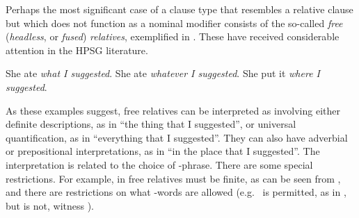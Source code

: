 \documentclass[output=paper
                ,modfonts
                ,nonflat
	        ,collection
	        ,collectionchapter
	        ,collectiontoclongg
 	        ,biblatex
                ,babelshorthands
                ,newtxmath
                ,draftmode
                ,colorlinks, citecolor=brown
]{./langsci/langscibook}
\begin{document}
Perhaps the most significant case of a clause type that resembles a relative clause but
which does not function as a nominal modifier consists of the so-called \emph{free}
(\emph{headless}, or \emph{fused}) \emph{relatives}, exemplified in . These
have received considerable attention in the HPSG literature.
\begin{exe}\ex\begin{xlist}\label{x:rc-137}
    \ex\label{x:rc-138} She ate \emph{what I suggested}.
    \ex\label{x:rc-139} She ate \emph{whatever I suggested}.
    \ex\label{x:rc-140} She put it \emph{where I suggested}.
\end{xlist}\end{exe}
As these examples suggest, free relatives can be interpreted as involving either definite
descriptions, as in  ``the thing that I suggested'', or universal
quantification, as in  ``everything that I suggested''. They can also have
adverbial or prepositional interpretations, as in  ``in the place that I
suggested''. The interpretation is related to the choice of -phrase.   There are some special
restrictions.  For example, in  free relatives must be finite, as can be seen
from , and there are restrictions on what -words are allowed (e.g.\
 is permitted, as in , but  is not, witness ).
\begin{exe}\ex\begin{xlist}\label{x:rc-141}
\end{xlist}\end{exe}
\end{document}
